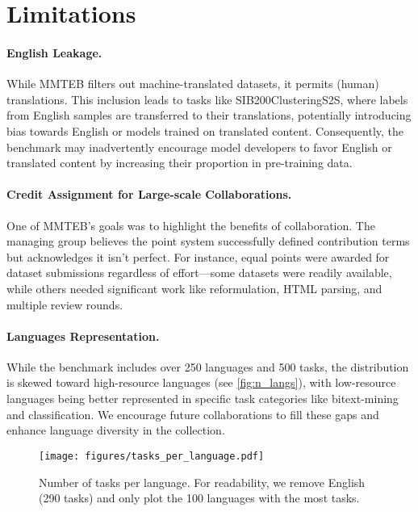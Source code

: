 
\section*{Limitations}


\paragraph{English Leakage.}
While MMTEB filters out machine-translated datasets, it permits (human) translations. This inclusion leads to tasks like SIB200ClusteringS2S, where labels from English samples are transferred to their translations, potentially introducing bias towards English or models trained on translated content. Consequently, the benchmark may inadvertently encourage model developers to favor English or translated content by increasing their proportion in pre-training data.

\paragraph{Credit Assignment for Large-scale Collaborations.}
One of MMTEB’s goals was to highlight the benefits of collaboration. The managing group believes the point system successfully defined contribution terms but acknowledges it isn’t perfect. For instance, equal points were awarded for dataset submissions regardless of effort—some datasets were readily available, while others needed significant work like reformulation, HTML parsing, and multiple review rounds.

\paragraph{Languages Representation.}
While the benchmark includes over 250 languages and 500 tasks, the distribution is skewed toward high-resource languages (see \autoref{fig:n_langs}), with low-resource languages being better represented in specific task categories like bitext-mining and classification. We encourage future collaborations to fill these gaps and enhance language diversity in the collection.

\begin{figure*}[!th]
    \centering
    \texttt{[image: figures/tasks\_per\_language.pdf]}
    \caption{Number of tasks per language. For readability, we remove English (290 tasks) and only plot the 100 languages with the most tasks.
    }
    \label{fig:n_langs}
    \vspace{-3mm}
\end{figure*}


